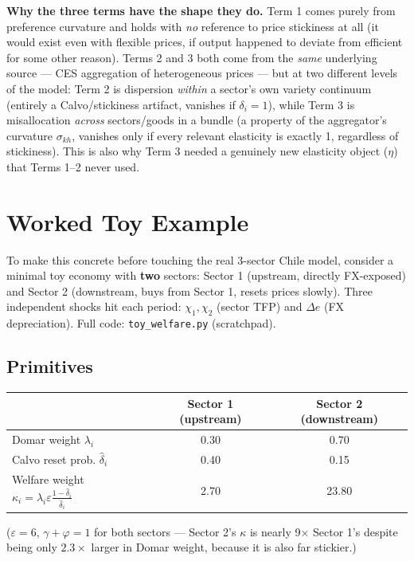 \documentclass[12pt]{article}
\begin{document}
\begin{keyresult}
\textbf{Why the three terms have the shape they do.} Term 1 comes purely from preference curvature
and holds with \emph{no} reference to price stickiness at all (it would exist even with flexible
prices, if output happened to deviate from efficient for some other reason). Terms 2 and 3 both come
from the \emph{same} underlying source — CES aggregation of heterogeneous prices — but at two
different levels of the model: Term 2 is dispersion \emph{within} a sector's own variety continuum
(entirely a Calvo/stickiness artifact, vanishes if $\delta_i=1$), while Term 3 is misallocation
\emph{across} sectors/goods in a bundle (a property of the aggregator's curvature $\sigma_{kh}$,
vanishes only if every relevant elasticity is exactly 1, regardless of stickiness). This is also
why Term 3 needed a genuinely new elasticity object ($\eta$) that Terms 1--2 never used.
\end{keyresult}

\section{Worked Toy Example}

To make this concrete before touching the real 3-sector Chile model, consider a minimal toy economy
with \textbf{two} sectors: Sector 1 (upstream, directly FX-exposed) and Sector 2 (downstream,
buys from Sector 1, resets prices slowly). Three independent shocks hit each period: $\chi_1,\chi_2$
(sector TFP) and $\Delta e$ (FX depreciation). Full code: \texttt{toy\_welfare.py} (scratchpad).

\subsection{Primitives}
\begin{center}
\begin{tabular}{lcc}
\toprule
 & Sector 1 (upstream) & Sector 2 (downstream) \\
\midrule
Domar weight $\lambda_i$ & 0.30 & 0.70 \\
Calvo reset prob. $\hat\delta_i$ & 0.40 & 0.15 \\
Welfare weight $\kappa_i = \lambda_i\varepsilon\frac{1-\hat\delta_i}{\hat\delta_i}$ & 2.70 & 23.80 \\
\bottomrule
\end{tabular}
\end{center}
($\varepsilon=6$, $\gamma+\varphi=1$ for both sectors — Sector 2's $\kappa$ is nearly 9$\times$
Sector 1's despite being only $2.3\times$ larger in Domar weight, because it is also far stickier.)
\end{document}
